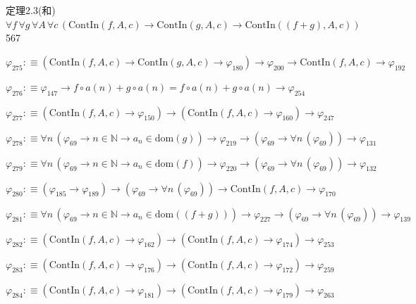 \begin{fullproof}{定理2.3(和)}{$\forall f\,\forall g\,\forall A\,\forall c\,(\mathrm{ContIn}(f,A,c) \to \mathrm{ContIn}(g,A,c) \to \mathrm{ContIn}((f + g),A,c))$}{567}
\begin{abbrevlist}
\item $\varphi_{275} :\equiv (\mathrm{ContIn}(f,A,c) \to \mathrm{ContIn}(g,A,c) \to \varphi_{180}) \to \varphi_{200} \to \mathrm{ContIn}(f,A,c) \to \varphi_{192}$
\item $\varphi_{276} :\equiv \varphi_{147} \to f \circ a(n) + g \circ a(n) = f \circ a(n) + g \circ a(n) \to \varphi_{254}$
\item $\varphi_{277} :\equiv (\mathrm{ContIn}(f,A,c) \to \varphi_{150}) \to (\mathrm{ContIn}(f,A,c) \to \varphi_{160}) \to \varphi_{247}$
\item $\varphi_{278} :\equiv \forall n\,(\varphi_{69} \to n \in \mathbb{N} \to a_{n} \in \mathrm{dom}(g)) \to \varphi_{219} \to (\varphi_{69} \to \forall n\,(\varphi_{69})) \to \varphi_{131}$
\item $\varphi_{279} :\equiv \forall n\,(\varphi_{69} \to n \in \mathbb{N} \to a_{n} \in \mathrm{dom}(f)) \to \varphi_{220} \to (\varphi_{69} \to \forall n\,(\varphi_{69})) \to \varphi_{132}$
\item $\varphi_{280} :\equiv (\varphi_{185} \to \varphi_{189}) \to (\varphi_{69} \to \forall n\,(\varphi_{69})) \to \mathrm{ContIn}(f,A,c) \to \varphi_{170}$
\item $\varphi_{281} :\equiv \forall n\,(\varphi_{69} \to n \in \mathbb{N} \to a_{n} \in \mathrm{dom}((f + g))) \to \varphi_{227} \to (\varphi_{69} \to \forall n\,(\varphi_{69})) \to \varphi_{139}$
\item $\varphi_{282} :\equiv (\mathrm{ContIn}(f,A,c) \to \varphi_{162}) \to (\mathrm{ContIn}(f,A,c) \to \varphi_{174}) \to \varphi_{253}$
\item $\varphi_{283} :\equiv (\mathrm{ContIn}(f,A,c) \to \varphi_{176}) \to (\mathrm{ContIn}(f,A,c) \to \varphi_{172}) \to \varphi_{259}$
\item $\varphi_{284} :\equiv (\mathrm{ContIn}(f,A,c) \to \varphi_{181}) \to (\mathrm{ContIn}(f,A,c) \to \varphi_{179}) \to \varphi_{263}$
\end{abbrevlist}
\end{fullproof}
